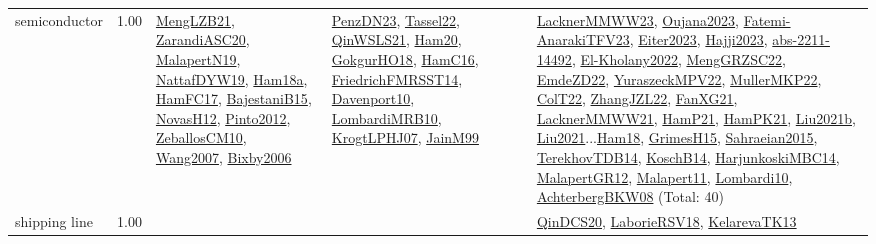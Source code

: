 {\begin{longtable}{p{3cm}r>{\raggedright\arraybackslash}p{6cm}>{\raggedright\arraybackslash}p{6cm}>{\raggedright\arraybackslash}p{8cm}}
\index{semiconductor}\index{ApplicationAreas!semiconductor}semiconductor &  1.00 & \hyperref[detail:MengLZB21]{MengLZB21}, \hyperref[detail:ZarandiASC20]{ZarandiASC20}, \hyperref[detail:MalapertN19]{MalapertN19}, \hyperref[detail:NattafDYW19]{NattafDYW19}, \hyperref[detail:Ham18a]{Ham18a}, \hyperref[detail:HamFC17]{HamFC17}, \hyperref[detail:BajestaniB15]{BajestaniB15}, \hyperref[detail:NovasH12]{NovasH12}, \hyperref[detail:Pinto2012]{Pinto2012}, \hyperref[detail:ZeballosCM10]{ZeballosCM10}, \hyperref[detail:Wang2007]{Wang2007}, \hyperref[detail:Bixby2006]{Bixby2006} & \hyperref[detail:PenzDN23]{PenzDN23}, \hyperref[detail:Tassel22]{Tassel22}, \hyperref[detail:QinWSLS21]{QinWSLS21}, \hyperref[detail:Ham20]{Ham20}, \hyperref[detail:GokgurHO18]{GokgurHO18}, \hyperref[detail:HamC16]{HamC16}, \hyperref[detail:FriedrichFMRSST14]{FriedrichFMRSST14}, \hyperref[detail:Davenport10]{Davenport10}, \hyperref[detail:LombardiMRB10]{LombardiMRB10}, \hyperref[detail:KrogtLPHJ07]{KrogtLPHJ07}, \hyperref[detail:JainM99]{JainM99} & \hyperref[detail:LacknerMMWW23]{LacknerMMWW23}, \hyperref[detail:Oujana2023]{Oujana2023}, \hyperref[detail:Fatemi-AnarakiTFV23]{Fatemi-AnarakiTFV23}, \hyperref[detail:Eiter2023]{Eiter2023}, \hyperref[detail:Hajji2023]{Hajji2023}, \hyperref[detail:abs-2211-14492]{abs-2211-14492}, \hyperref[detail:El-Kholany2022]{El-Kholany2022}, \hyperref[detail:MengGRZSC22]{MengGRZSC22}, \hyperref[detail:EmdeZD22]{EmdeZD22}, \hyperref[detail:YuraszeckMPV22]{YuraszeckMPV22}, \hyperref[detail:MullerMKP22]{MullerMKP22}, \hyperref[detail:ColT22]{ColT22}, \hyperref[detail:ZhangJZL22]{ZhangJZL22}, \hyperref[detail:FanXG21]{FanXG21}, \hyperref[detail:LacknerMMWW21]{LacknerMMWW21}, \hyperref[detail:HamP21]{HamP21}, \hyperref[detail:HamPK21]{HamPK21}, \hyperref[detail:Liu2021b]{Liu2021b}, \hyperref[detail:Liu2021]{Liu2021}...\hyperref[detail:Ham18]{Ham18}, \hyperref[detail:GrimesH15]{GrimesH15}, \hyperref[detail:Sahraeian2015]{Sahraeian2015}, \hyperref[detail:TerekhovTDB14]{TerekhovTDB14}, \hyperref[detail:KoschB14]{KoschB14}, \hyperref[detail:HarjunkoskiMBC14]{HarjunkoskiMBC14}, \hyperref[detail:MalapertGR12]{MalapertGR12}, \hyperref[detail:Malapert11]{Malapert11}, \hyperref[detail:Lombardi10]{Lombardi10}, \hyperref[detail:AchterbergBKW08]{AchterbergBKW08} (Total: 40)\\
\index{shipping line}\index{ApplicationAreas!shipping line}shipping line &  1.00 &  &  & \hyperref[detail:QinDCS20]{QinDCS20}, \hyperref[detail:LaborieRSV18]{LaborieRSV18}, \hyperref[detail:KelarevaTK13]{KelarevaTK13}\\

\end{longtable}}
